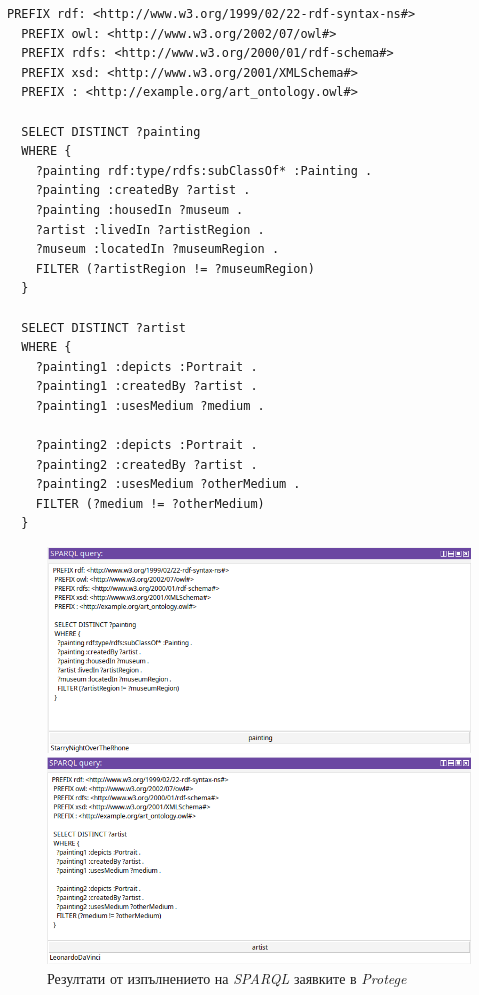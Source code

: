 \documentclass[a4paper, 11pt]{article}
\begin{document}
\begin{lstlisting}[language=SPARQL]
  PREFIX rdf: <http://www.w3.org/1999/02/22-rdf-syntax-ns#>
  PREFIX owl: <http://www.w3.org/2002/07/owl#>
  PREFIX rdfs: <http://www.w3.org/2000/01/rdf-schema#>
  PREFIX xsd: <http://www.w3.org/2001/XMLSchema#>
  PREFIX : <http://example.org/art_ontology.owl#>

  SELECT DISTINCT ?painting
  WHERE {
    ?painting rdf:type/rdfs:subClassOf* :Painting .
    ?painting :createdBy ?artist .
    ?painting :housedIn ?museum .
    ?artist :livedIn ?artistRegion .
    ?museum :locatedIn ?museumRegion .
    FILTER (?artistRegion != ?museumRegion)
  }

  SELECT DISTINCT ?artist
  WHERE {
    ?painting1 :depicts :Portrait .
    ?painting1 :createdBy ?artist .
    ?painting1 :usesMedium ?medium .

    ?painting2 :depicts :Portrait .
    ?painting2 :createdBy ?artist .
    ?painting2 :usesMedium ?otherMedium .
    FILTER (?medium != ?otherMedium)
  }
\end{lstlisting}
\begin{figure}[H]
  \includegraphics[width=\linewidth]{images/q1.png}
  \par
  \vspace{1cm}
  \includegraphics[width=\linewidth]{images/q2.png}
  \caption{Резултати от изпълнението на \emph{SPARQL} заявките в \emph{Protege}}
\end{figure}
\pagebreak
\end{document}
